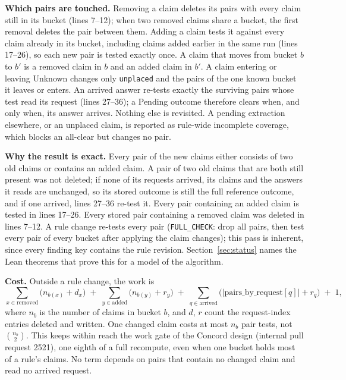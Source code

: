 \documentclass[11pt]{article}
\newcommand{\code}[1]{\texttt{#1}}
\begin{document}
\textbf{Which pairs are touched.} Removing a claim deletes its pairs with every
claim still in its bucket (lines 7--12); when two removed claims share a
bucket, the first removal deletes the pair between them. Adding a claim tests
it against every claim already in its bucket, including claims added earlier in
the same run (lines 17--26), so each new pair is tested exactly once. A claim
that moves from bucket $b$ to $b'$ is a removed claim in $b$ and an added claim
in $b'$. A claim entering or leaving Unknown changes only \code{unplaced} and
the pairs of the one known bucket it leaves or enters. An arrived answer
re-tests exactly the surviving pairs whose test read its request (lines
27--36); a Pending outcome therefore clears when, and only when, its answer
arrives. Nothing else is revisited. A pending extraction elsewhere, or an
unplaced claim, is reported as rule-wide incomplete coverage, which blocks an
all-clear but changes no pair.

\textbf{Why the result is exact.} Every pair of the new claims either consists
of two old claims or contains an added claim. A pair of two old claims that
are both still present was not deleted; if none of its requests arrived, its
claims and the answers it reads are unchanged, so its stored outcome is still
the full reference outcome, and if one arrived, lines 27--36 re-test it. Every
pair containing an added claim is tested in lines 17--26. Every stored pair
containing a removed claim was deleted in lines 7--12. A rule change re-tests
every pair (\code{FULL\_CHECK}: drop all pairs, then test every pair of every
bucket after applying the claim changes); this pass is inherent, since every
finding key contains the rule revision. Section~\ref{sec:status} names the
Lean theorems that prove this for a model of the algorithm.

\textbf{Cost.} Outside a rule change, the work is
\[
\sum_{x\in\text{removed}} \bigl(n_{b(x)} + d_x\bigr)
\;+\; \sum_{y\in\text{added}} \bigl(n_{b(y)} + r_y\bigr)
\;+\; \sum_{q\in\text{arrived}} \bigl(|\text{pairs\_by\_request}[q]| + r_q\bigr)
\;+\; 1,
\]
where $n_{b}$ is the number of claims in bucket $b$, and $d$, $r$ count the
request-index entries deleted and written. One changed claim costs at most
$n_b$ pair tests, not $\binom{n_b}{2}$. This keeps within reach the work
gate of the Concord design (internal pull request 2521), one eighth of a
full recompute, even when one bucket holds most of
a rule's claims. No term depends on pairs that contain no changed claim and
read no arrived request.
\end{document}
